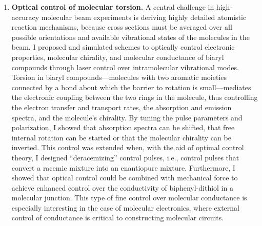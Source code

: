 \documentclass{nihbiosketch}
\begin{document}
\begin{enumerate}
  \item \begin{bibunit}[nih]
  \textbf{Optical control of molecular torsion.}
  A central challenge in high-accuracy molecular beam experiments is deriving highly detailed atomistic
  reaction mechanisms, because cross sections must be averaged over all possible orientations and
  available vibrational states of
  the molecules in the beam. I proposed and simulated schemes to optically control electronic
  properties, molecular chirality, and molecular conductance of biaryl compounds through laser control over
  intramolecular vibrational modes.\cite{Parker2011JCP224301}
  Torsion in biaryl compounds---molecules with two aromatic moieties connected by a bond about which the barrier
  to rotation is small---mediates the electronic coupling between the two rings in the molecule, thus controlling
  the electron transfer and transport rates, the absorption and emission spectra, and the
  molecule's chirality.
  By tuning the pulse parameters and
  polarization, I showed that absorption spectra can be shifted, that free internal rotation can be started or
  that the molecular chirality
  can be inverted.\cite{Parker2011JCP224301} This control was extended when, with the aid of optimal control theory,
  I designed ``deracemizing'' control pulses, i.e., control
  pulses that convert a racemic mixture into an enantiopure mixture.\cite{Parker2012MolPhys1941}
  Furthermore, I showed that optical control could be combined with mechanical force to achieve
  enhanced control over the conductivity of biphenyl-dithiol in a molecular junction.\cite{Parker2014NanoLett4587}
  This type of fine control over molecular conductance is especially interesting in the case of molecular electronics,
  where external control of conductance is critical to constructing molecular circuits.

  \renewcommand{\refname}{\vspace{-2em}}
  \end{bibunit}


\end{enumerate}
\end{document}
